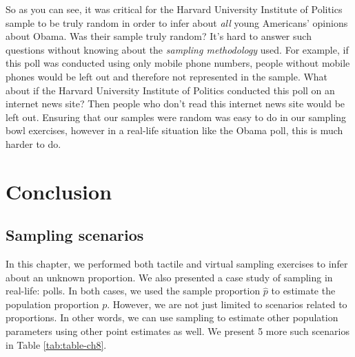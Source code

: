 \documentclass[
]{book}
\begin{document}
So as you can see, it was critical for the Harvard University Institute of Politics sample to be truly random in order to infer about \emph{all} young Americans' opinions about Obama. Was their sample truly random? It's hard to answer such questions without knowing about the \emph{sampling methodology} used. For example, if this poll was conducted using only mobile phone numbers, people without mobile phones would be left out and therefore not represented in the sample. What about if the Harvard University Institute of Politics conducted this poll on an internet news site? Then people who don't read this internet news site would be left out. Ensuring that our samples were random was easy to do in our sampling bowl exercises, however in a real-life situation like the Obama poll, this is much harder to do.

\hypertarget{sampling-conclusion}{%
\section{Conclusion}\label{sampling-conclusion}}

\hypertarget{sampling-conclusion-table}{%
\subsection{Sampling scenarios}\label{sampling-conclusion-table}}

In this chapter, we performed both tactile and virtual sampling exercises to infer about an unknown proportion. We also presented a case study of sampling in real-life: polls. In both cases, we used the sample proportion \(\widehat{p}\) to estimate the population proportion \(p\). However, we are not just limited to scenarios related to proportions. In other words, we can use sampling to estimate other population parameters using other point estimates as well. We present 5 more such scenarios in Table \ref{tab:table-ch8}.
\end{document}
